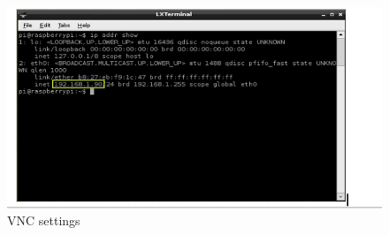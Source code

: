 \documentclass[12pt, a4paper]{article}
\begin{document}
\begin{figure}[htp]
	\centering
	\includegraphics[scale=0.3]{rpi.png}
	\caption{VNC settings}
	\label{}
\end{figure}
\end{document}
